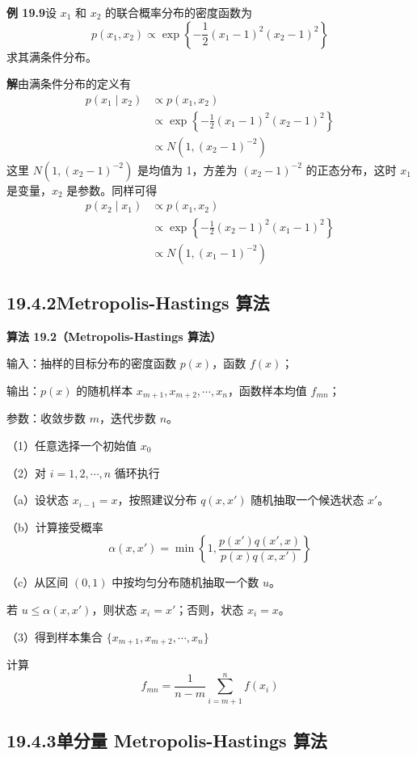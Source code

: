 \documentclass[UTF8,12pt,a4paper,fontset=fandol]{ctexart}
\begin{document}
\noindent\textbf{例 19.9}\quad 设 $x_1$ 和 $x_2$ 的联合概率分布的密度函数为
\[
p(x_1,x_2)\propto \exp\left\{-\frac{1}{2}(x_1-1)^2(x_2-1)^2\right\}
\]
求其满条件分布。

\noindent\textbf{解}\quad 由满条件分布的定义有
\[
\begin{aligned}
p(x_1\mid x_2)&\propto p(x_1,x_2)\\
&\propto \exp\left\{-\frac{1}{2}(x_1-1)^2(x_2-1)^2\right\}\\
&\propto N(1,(x_2-1)^{-2})
\end{aligned}
\]
这里 $N(1,(x_2-1)^{-2})$ 是均值为 1，方差为 $(x_2-1)^{-2}$ 的正态分布，这时 $x_1$ 是变量，$x_2$ 是参数。同样可得
\[
\begin{aligned}
p(x_2\mid x_1)&\propto p(x_1,x_2)\\
&\propto \exp\left\{-\frac{1}{2}(x_2-1)^2(x_1-1)^2\right\}\\
&\propto N(1,(x_1-1)^{-2})
\end{aligned}
\]

\subsection*{19.4.2\quad Metropolis-Hastings 算法}

\noindent\textbf{算法 19.2（Metropolis-Hastings 算法）}

输入：抽样的目标分布的密度函数 $p(x)$，函数 $f(x)$；

输出：$p(x)$ 的随机样本 $x_{m+1},x_{m+2},\cdots,x_n$，函数样本均值 $f_{mn}$；

参数：收敛步数 $m$，迭代步数 $n$。

（1）任意选择一个初始值 $x_0$

（2）对 $i=1,2,\cdots,n$ 循环执行

（a）设状态 $x_{i-1}=x$，按照建议分布 $q(x,x')$ 随机抽取一个候选状态 $x'$。

（b）计算接受概率
\[
\alpha(x,x')=\min\left\{1,\frac{p(x')q(x',x)}{p(x)q(x,x')}\right\}
\]

（c）从区间 $(0,1)$ 中按均匀分布随机抽取一个数 $u$。

若 $u\leqslant \alpha(x,x')$，则状态 $x_i=x'$；否则，状态 $x_i=x$。

（3）得到样本集合 $\{x_{m+1},x_{m+2},\cdots,x_n\}$

计算
\[
f_{mn}=\frac{1}{n-m}\sum_{i=m+1}^{n}f(x_i)
\]

\subsection*{19.4.3\quad 单分量 Metropolis-Hastings 算法}
\end{document}
